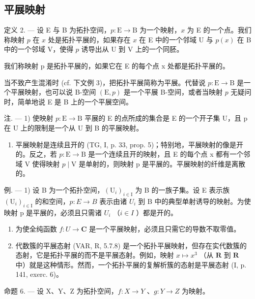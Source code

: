 \subsection{平展映射}

定义 2. --- 设 E 与 B 为拓扑空间，\(p\colon\mathrm{E}\to\mathrm{B}\) 为一个映射，\(x\) 为 E 的一个点。我们称映射 \(p\) 在 \(x\) 处是拓扑平展的，如果存在 \(x\) 在 E 中的一个邻域 U 与 \(p(x)\) 在 B 中的一个邻域 V，使得 \(p\) 诱导出从 U 到 V 上的一个同胚。

我们称映射 p 是拓扑平展的，如果它在 E 的每个点 x 处都是拓扑平展的。

当不致产生混淆时 (cf. 下文例 3)，把拓扑平展简称为平展。代替说 \(p\colon \mathrm{E}\to \mathrm{B}\) 是一个平展映射，也可以说 B-空间 \((\mathrm{E},p)\) 是一个平展 B-空间，或者当映射 \(p\) 无疑问时，简单地说 E 是 B 上的一个平展空间。

注. --- 1) 使映射 \(p \colon \mathrm{E} \to \mathrm{B}\) 平展的 E 的点所成的集合是 E 的一个开子集 U，且 p 在 U 上的限制是一个从 U 到 B 的平展映射。

\begin{enumerate}
\def\labelenumi{\arabic{enumi})}
\setcounter{enumi}{1}
\tightlist
\item
  平展映射是连续且开的 (TG, I, p. 33, prop. 5)；特别地，平展映射的像是开的。反之，若 \(p \colon \mathrm{E} \to \mathrm{B}\) 是一个连续且开的映射，且 E 的每个点 x 都有一个邻域 V 使得映射 \(p \mid \mathrm{V}\) 是单射的，则映射 p 是平展的。平展映射的纤维是离散的。
\end{enumerate}

例. --- 1) 设 B 为一个拓扑空间，\((\mathrm{U}_{i})_{i\in\mathrm{I}}\) 为 B 的一族子集。设 E 表示族 \((\mathrm{U}_{i})_{i\in\mathrm{I}}\) 的和空间，\(p: E \to B\) 表示由诸 \(U_{i}\) 到 B 中的典型单射诱导的映射。为使映射 p 是平展的，必须且只需诸 \(U_{i}\) （\(i \in I\) ）都是开的。

\begin{enumerate}
\def\labelenumi{\arabic{enumi})}
\setcounter{enumi}{1}
\item
为使全纯函数 \(f\colon U \to \mathbf{C}\) 是一个平展映射，必须且只需它的导数不取零值。
\item
  代数簇的平展态射 (VAR, R, 5.7.8) 是一个拓扑平展映射，但存在实代数簇的态射，它是拓扑平展的而不是平展态射。例如，映射 \(x \mapsto x^3\) （从 \(\mathbf{R}\) 到 \(\mathbf{R}\) 中）就是这种情形。然而，一个拓扑平展的复解析簇的态射是平展态射 (I, p. 141, exerc. 6)。
\end{enumerate}

命题 6. — 设 X、Y、Z 为拓扑空间，\(f\colon X\to Y\) 、\(g\colon Y\to Z\) 为映射。

